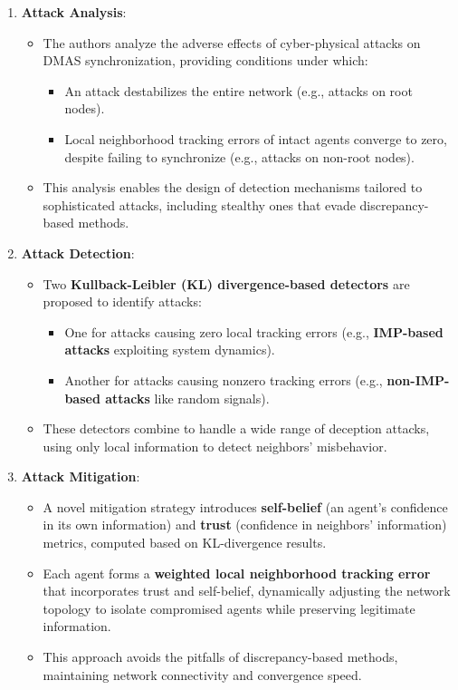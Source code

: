 \documentclass{article}
\begin{document}
\begin{enumerate}
    \item \textbf{Attack Analysis}:
    \begin{itemize}
        \item The authors analyze the adverse effects of cyber-physical attacks on DMAS synchronization, providing conditions under which:
        \begin{itemize}
            \item An attack destabilizes the entire network (e.g., attacks on root nodes).
            \item Local neighborhood tracking errors of intact agents converge to zero, despite failing to synchronize (e.g., attacks on non-root nodes).
        \end{itemize}
        \item This analysis enables the design of detection mechanisms tailored to sophisticated attacks, including stealthy ones that evade discrepancy-based methods.
    \end{itemize}
    
    \item \textbf{Attack Detection}:
    \begin{itemize}
        \item Two \textbf{Kullback-Leibler (KL) divergence-based detectors} are proposed to identify attacks:
        \begin{itemize}
            \item One for attacks causing zero local tracking errors (e.g., \textbf{IMP-based attacks} exploiting system dynamics).
            \item Another for attacks causing nonzero tracking errors (e.g., \textbf{non-IMP-based attacks} like random signals).
        \end{itemize}
        \item These detectors combine to handle a wide range of deception attacks, using only local information to detect neighbors’ misbehavior.
    \end{itemize}
    
    \item \textbf{Attack Mitigation}:
    \begin{itemize}
        \item A novel mitigation strategy introduces \textbf{self-belief} (an agent’s confidence in its own information) and \textbf{trust} (confidence in neighbors’ information) metrics, computed based on KL-divergence results.
        \item Each agent forms a \textbf{weighted local neighborhood tracking error} that incorporates trust and self-belief, dynamically adjusting the network topology to isolate compromised agents while preserving legitimate information.
        \item This approach avoids the pitfalls of discrepancy-based methods, maintaining network connectivity and convergence speed.
    \end{itemize}
\end{enumerate}
\end{document}
